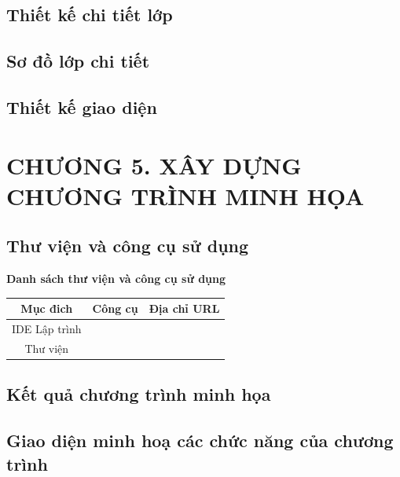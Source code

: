 \documentclass{article}
\begin{document}
\subsection{Thiết kế chi tiết lớp}


\subsection{Sơ đồ lớp chi tiết}
\subsection{Thiết kế giao diện}

\newpage

\section*{CHƯƠNG 5. XÂY DỰNG CHƯƠNG TRÌNH MINH HỌA}
\setcounter{section}{5}
\setcounter{subsection}{0}
\subsection{Thư viện và công cụ sử dụng}
\begin{center}
    \textbf{Danh sách thư viện và công cụ sử dụng} \\
    \begin{tabular}{|c|c|c|}
        \hline
        \textbf{Mục đich} & \textbf{Công cụ} & \textbf{Địa chỉ URL} \\
        \hline
        IDE Lập trình &  & \\
        \hline
        Thư viện &  & \\
        \hline
    \end{tabular}
\end{center}
\subsection{Kết quả chương trình minh họa}
\subsection{Giao diện minh hoạ các chức năng của chương trình}
\newpage
\end{document}
